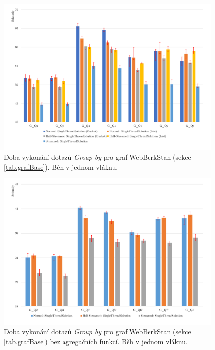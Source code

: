 \begin{figure}[!htp]
\includegraphics[width=\linewidth]{../img/webberkstanGroupByST.pdf}\centering
\caption{Doba vykonání dotazů \textit{Group by} pro graf WebBerkStan (sekce \ref{tab.grafBase}). Běh v jednom vláknu.}
\label{figure.webberkstanGroupByST}
\end{figure}
\begin{figure}[!htp]
\includegraphics[width=\linewidth]{../img/webberkstanGroupBySTNoAgg.pdf}\centering
\caption{Doba vykonání dotazů \textit{Group by} pro graf WebBerkStan (sekce \ref{tab.grafBase}) bez agregačních funkcí. Běh v jednom vláknu.}
\label{figure.webberkstanGroupBySTNoAgg}
\end{figure}


